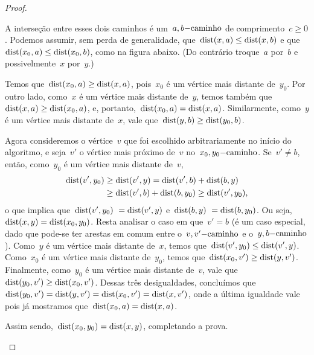 \begin{proof}
\begin{itemize}
			A interseção entre esses dois caminhos é 
			um~$a,b\mathrm{-caminho}$ de comprimento~$c \ge 0$.
			Podemos assumir, sem perda de generalidade, 
			que~${\mathrm{dist}(x,a) \le \mathrm{dist}(x,b)}$ e 
			que~${\mathrm{dist}(x_0,a) \le \mathrm{dist}(x_0,b)}$, como na figura 
			abaixo.
			(Do contrário troque~$a$ por~$b$ e possivelmente~$x$
			por~$y$.)

			\begin{center}  \end{center}


			Temos que~${\mathrm{dist}(x_0,a)\ge \mathrm{dist}(x,a)}$,
			pois~$x_0$ é um vértice mais distante de~$y_0$.
			Por outro lado, como~$x$ é um vértice mais distante
			de~$y$, temos também que~${\mathrm{dist}(x,a)\ge \mathrm{dist}(x_0,a)}$,
			e, portanto,~${\mathrm{dist}(x_0,a) =\mathrm{dist}(x,a)}$.
			Similarmente, como~$y$ é um vértice mais distante 
			de~$x$, vale que~${\mathrm{dist}(y,b) \ge \mathrm{dist}(y_0,b)}$.

			Agora consideremos o vértice~$v$ que foi escolhido 
			arbitrariamente no início do algoritmo, e seja~$v'$
			o vértice mais próximo de~$v$ no~$x_0,y_0\mathrm{-caminho}$.
			Se~$v'\ne b$, então, como~$y_0$ é um vértice mais 
			distante de~$v$,
			\begin{align}
				\mathrm{dist}(v',y_0) &\ge \mathrm{dist}(v',y) =\mathrm{dist}(v',b) + 
				\mathrm{dist}(b,y)\nonumber \\
				&\ge \mathrm{dist}(v',b) + \mathrm{dist}(b,y_0) \ge \mathrm{dist}(v',y_0) 
				\nonumber,
			\end{align} 
			o que implica que~${\mathrm{dist}(v',y_0)~=\mathrm{dist}(v',y)}$ 
			e~${\mathrm{dist}(b,y)~=\mathrm{dist}(b,y_0)}$. 
			Ou seja,~${\mathrm{dist}(x,y) =\mathrm{dist}(x_0,y_0)}$.
			Resta analisar o caso em que~$v'=b$ (é um caso 
			especial, dado que pode-se ter arestas em comum 
			entre o~$v,v'\mathrm{-caminho}$ e o~$y,b\mathrm{-caminho}$).
			Como~$y$ é um vértice mais distante de~$x$, temos 
			que~$\mathrm{dist}(v',y_0) \le \mathrm{dist}(v',y)$.
			Como~$x_0$ é um vértice mais distante de~$y_0$, temos
			que~$\mathrm{dist}(x_0,v') \ge \mathrm{dist}(y,v')$.
			Finalmente, como~$y_0$ é um vértice mais distante 
			de~$v$, vale que~$\mathrm{dist}(y_0,v')\ge \mathrm{dist}(x_0,v')$.
			Dessas três desigualdades, concluímos 
			que~${\mathrm{dist}(y_0,v')=\mathrm{dist}(y,v')=\mathrm{dist}(x_0,v')=\mathrm{dist}(x,v')}$,
			onde a última igualdade vale pois já mostramos 
			que~${\mathrm{dist}(x_0,a) =\mathrm{dist}(x,a)}$.

			Assim sendo,~${\mathrm{dist}(x_0,y_0) =\mathrm{dist}(x,y)}$, completando a 
			prova.
		\end{itemize}
	\end{proof}

